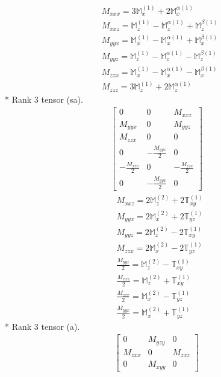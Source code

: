 \documentclass[fleqn,8pt,landscape]{jsarticle}
\begin{document}
\begin{align*}
& M_{xxx} = 3 \mathbb{M}_{x}^{(1)} + 2 \mathbb{M}_{x}^{\alpha(1)} \\
& M_{xxz} = \mathbb{M}_{z}^{(1)} - \mathbb{M}_{z}^{\alpha(1)} + \mathbb{M}_{z}^{\beta(1)} \\
& M_{yyx} = \mathbb{M}_{x}^{(1)} - \mathbb{M}_{x}^{\alpha(1)} + \mathbb{M}_{x}^{\beta(1)} \\
& M_{yyz} = \mathbb{M}_{z}^{(1)} - \mathbb{M}_{z}^{\alpha(1)} - \mathbb{M}_{z}^{\beta(1)} \\
& M_{zzx} = \mathbb{M}_{x}^{(1)} - \mathbb{M}_{x}^{\alpha(1)} - \mathbb{M}_{x}^{\beta(1)} \\
& M_{zzz} = 3 \mathbb{M}_{z}^{(1)} + 2 \mathbb{M}_{z}^{\alpha(1)}
\end{align*}
* Rank 3 tensor (sa).
\begin{align*}
\begin{bmatrix} 0 & 0 & M_{xxz} \\ M_{yyx} & 0 & M_{yyz} \\ M_{zzx} & 0 & 0 \\ 0 & - \frac{M_{yyz}}{2} & 0 \\ - \frac{M_{xxz}}{2} & 0 & - \frac{M_{zzx}}{2} \\ 0 & - \frac{M_{yyx}}{2} & 0 \end{bmatrix}
\end{align*}
\begin{align*}
& M_{xxz} = 2 \mathbb{M}_{z}^{(2)} + 2 \mathbb{T}_{xy}^{(1)} \\
& M_{yyx} = 2 \mathbb{M}_{x}^{(2)} + 2 \mathbb{T}_{yz}^{(1)} \\
& M_{yyz} = 2 \mathbb{M}_{z}^{(2)} - 2 \mathbb{T}_{xy}^{(1)} \\
& M_{zzx} = 2 \mathbb{M}_{x}^{(2)} - 2 \mathbb{T}_{yz}^{(1)} \\
& \frac{M_{yyz}}{2} = \mathbb{M}_{z}^{(2)} - \mathbb{T}_{xy}^{(1)} \\
& \frac{M_{xxz}}{2} = \mathbb{M}_{z}^{(2)} + \mathbb{T}_{xy}^{(1)} \\
& \frac{M_{zzx}}{2} = \mathbb{M}_{x}^{(2)} - \mathbb{T}_{yz}^{(1)} \\
& \frac{M_{yyx}}{2} = \mathbb{M}_{x}^{(2)} + \mathbb{T}_{yz}^{(1)}
\end{align*}
* Rank 3 tensor (a).
\begin{align*}
\begin{bmatrix} 0 & M_{yzy} & 0 \\ M_{zxx} & 0 & M_{zxz} \\ 0 & M_{xyy} & 0 \end{bmatrix}
\end{align*}
\end{document}
